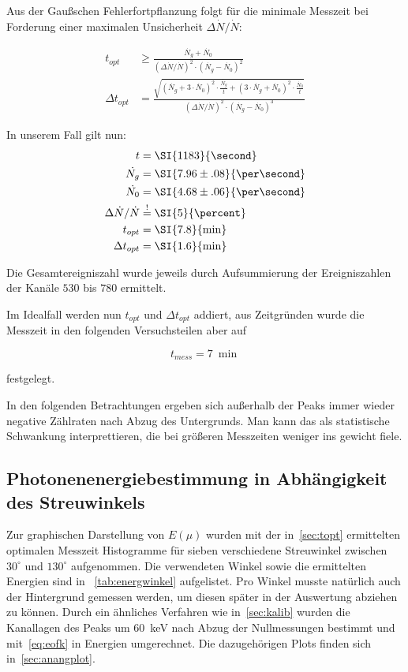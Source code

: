 \documentclass[slug=CS, room=Andreas-Schubert-Bau\,\ Labor\ 406,
supervisor=Juliane\ Volkmer, coursedate=29.\ 11.\ 2019]{../../Lab_Report_LaTeX/lab_report}
\newcommand{\kev}[1]{\SI{#1}{\kilo\electronvolt}}
\begin{document}
Aus der Gau\ss{}schen Fehlerfortpflanzung folgt f\"ur die minimale
Messzeit bei Forderung einer maximalen Unsicherheit
\(\Delta\dot{N}/\dot{N}\):

\begin{align}
  \label{eq:mtime}
  t_{opt} & \geq\frac{\dot{N_g} +
            \dot{N_0}}{(\Delta\dot{N}/\dot{N})^2\cdot (\dot{N_g} -
            \dot{N_0})^2} \\
  \Delta t_{opt} &=\frac{\sqrt{(\dot{N_g} +
                   3\cdot\dot{N_0})^2\cdot\frac{\dot{N_g}}{t}
                   + (3\cdot\dot{N_g} + \dot{N_0})^2\cdot\frac{\dot{N_0}}{t}}}{(\Delta\dot{N}/\dot{N})^2\cdot (\dot{N_g} -
            \dot{N_0})^3}
\end{align}

In unserem Fall gilt nun:
\begin{align}
  t &=\SI{1183}{\second} \\
  \dot{N_g} &=\SI{7.96\pm.08}{\per\second} \\
  \dot{N_0} &=\SI{4.68\pm.06}{\per\second} \\
  \Delta\dot{N}/\dot{N} &\overset{!}{=}\SI{5}{\percent} \\
  t_{opt} &=\SI{7.8}{\min} \\
  \Delta t_{opt} &=\SI{1.6}{\min}
\end{align}

Die Gesamtereigniszahl wurde jeweils durch Aufsummierung der
Ereigniszahlen der Kan\"ale \(530\) bis \(780\) ermittelt.

Im Idealfall werden nun \(t_{opt}\) und \(\Delta t_{opt}\) addiert,
aus Zeitgr\"unden wurde die Messzeit in den folgenden Versuchsteilen
aber auf

\begin{equation}
  \label{eq:fmtime}
  t_{mess} = \SI{7}{\min}
\end{equation}

festgelegt.

In den folgenden Betrachtungen ergeben sich au\ss{}erhalb der Peaks
immer wieder negative Z\"ahlraten nach Abzug des Untergrunds. Man kann das als statistische Schwankung interprettieren, die bei gr\"o\ss{}eren Messzeiten weniger ins gewicht fiele.

\subsection{Photonenenergiebestimmung in Abhängigkeit des Streuwinkels}
\label{sec:energwinkel}

Zur graphischen Darstellung von \(E(\mu)\) wurden mit der
in~\ref{sec:topt} ermittelten optimalen Messzeit Histogramme für
sieben verschiedene Streuwinkel zwischen \(30^\circ\) und
\(130^\circ\) aufgenommen. Die verwendeten Winkel sowie die
ermittelten Energien sind in ~\ref{tab:energwinkel} aufgelistet. Pro
Winkel musste natürlich auch der Hintergrund gemessen werden, um
diesen später in der Auswertung abziehen zu können. Durch ein
\"ahnliches Verfahren wie in~\ref{sec:kalib} wurden die Kanallagen des
Peaks um \kev{60} nach Abzug der Nullmessungen bestimmt und
mit~\ref{eq:eofk} in Energien umgerechnet. Die dazugeh\"origen Plots
finden sich in~\ref{sec:anangplot}.
\end{document}
